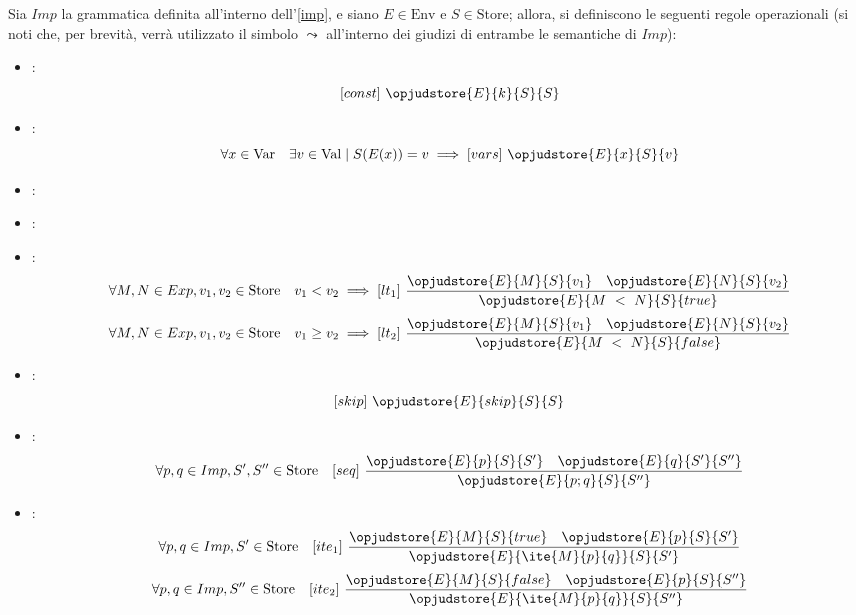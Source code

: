 \documentclass[a4paper, 12pt]{report}
\begin{document}
    \begin{example}
        \label{imp sem}
        Sia $Imp$ la grammatica definita all'interno dell'\cref{imp}, e siano $E \in \mathrm{Env}$ e $S \in \mathrm{Store}$; allora, si definiscono le seguenti regole operazionali (si noti che, per brevità, verrà utilizzato il simbolo $\leadsto$ all'interno dei giudizi di entrambe le semantiche di $Imp$):

        \begin{itemize}
            \item {}: $$[const] \ \opjudstore{E}{k}{S}{S}$$
            \item {}: $$\forall x \in \mathrm{Var} \quad \exists v \in \mathrm{Val} \mid S(E(x)) = v \implies [vars] \ \opjudstore{E}{x}{S}{v}$$
            \item {}: 
            \item {}: 
            \item {}: $$\forall M, N \in Exp, v_1, v_2 \in \mathrm{Store} \quad v_1 < v_2 \implies [lt_1] \ \dfrac{\opjudstore{E}{M}{S}{v_1} \quad \opjudstore{E}{N}{S}{v_2}}{\opjudstore{E}{M \ < \ N}{S}{true}}$$ $$\forall M, N \in Exp, v_1, v_2 \in \mathrm{Store} \quad v_1 \ge v_2 \implies [lt_2] \ \dfrac{\opjudstore{E}{M}{S}{v_1} \quad \opjudstore{E}{N}{S}{v_2}}{\opjudstore{E}{M \ < \ N}{S}{false}}$$
            \item {}: $$[skip] \ \opjudstore{E}{skip}{S}{S}$$
            \item {}: $$\forall p, q \in Imp, S', S'' \in \mathrm{Store} \quad [seq] \ \dfrac{\opjudstore{E}{p}{ S}{S'} \quad \opjudstore{E}{q}{ S'}{S''}}{\opjudstore{E}{p;q}{S}{S''}}$$
            \item {}: $$\forall p, q \in Imp, S' \in \mathrm{Store} \quad [ite_1] \ \dfrac{\opjudstore{E}{M}{ S}{true} \quad \opjudstore{E}{p}{S}{S'}}{\opjudstore{E}{\ite{M}{p}{q}}{S}{S'}}$$ $$\forall p, q \in Imp, S'' \in \mathrm{Store} \quad [ite_2] \ \dfrac{\opjudstore{E}{M}{S}{false} \quad \opjudstore{E}{p}{S}{S''}}{\opjudstore{E}{\ite{M}{p}{q}}{S}{S''}}$$

\end{itemize}
\end{example}
\end{document}
